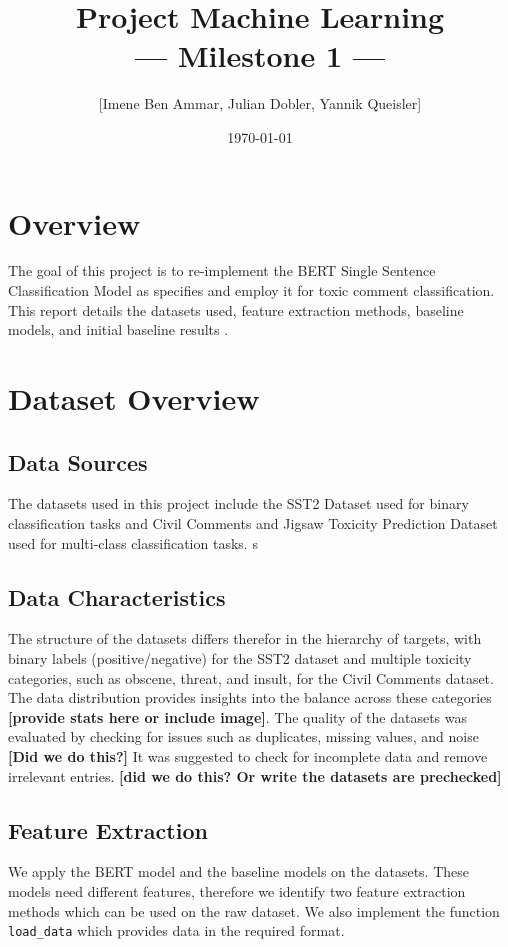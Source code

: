 \documentclass[10pt,a4paper,oneside]{article} %
\title{Project Machine Learning\\--- Milestone 1 ---}
\author{[Imene Ben Ammar, Julian Dobler, Yannik Queisler]}
\date{\today}
\begin{document}
\maketitle

\tableofcontents
\newpage

\section{Overview}
The goal of this project is to re-implement the BERT Single Sentence Classification Model as \cite{kenton2019bert} specifies and employ it for toxic comment classification.
This report details the datasets used, feature extraction methods, baseline models, and initial baseline results .

\section{Dataset Overview}
\subsection{Data Sources}
The datasets used in this project include the SST2 Dataset used for binary classification tasks and Civil Comments and Jigsaw Toxicity Prediction Dataset used for multi-class classification tasks.
s

\subsection{Data Characteristics}
The structure of the datasets differs therefor in the hierarchy of targets, with binary labels (positive/negative) for the SST2 dataset and multiple toxicity categories, such as obscene, threat, and insult, for the Civil Comments dataset. The data distribution provides insights into the balance across these categories \textbf{[provide stats here or include image]}. The quality of the datasets was evaluated by checking for issues such as duplicates, missing values, and noise \textbf{[Did we do this?]} It was suggested to check for incomplete data and remove irrelevant entries. \textbf{[did we do this? Or write the datasets are prechecked]}

\subsection{Feature Extraction}
We apply the BERT model and the baseline models on the datasets. These models need different features, therefore we identify two feature extraction methods which can be used on the raw dataset. We also implement the function \texttt{load\_data} which provides data in the required format.
\end{document}
